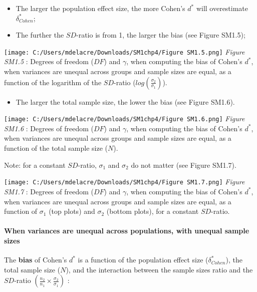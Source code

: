 \documentclass[
  english,
  man,mask,floatsintext]{apa6}
\providecommand{\tightlist}{%
  \setlength{\itemsep}{0pt}\setlength{\parskip}{0pt}}
\let\oldparagraph\paragraph
\renewcommand{\paragraph}[1]{\oldparagraph{#1}\mbox{}}
\begin{document}
\begin{itemize}
\item
  The larger the population effect size, the more Cohen's \(d^*\) will overestimate \(\delta^*_{Cohen}\);
\item
  The further the \(SD\)-ratio is from 1, the larger the bias (see Figure SM1.5);
\end{itemize}

\texttt{[image: C:/Users/mdelacre/Downloads/SM1chp4/Figure SM1.5.png]}
\emph{Figure SM1.5} : Degrees of freedom (\(DF\)) and \(\gamma\), when computing the bias of Cohen's \(d^*\), when variances are unequal across groups and sample sizes are equal, as a function of the logarithm of the \(SD\)-ratio (\(log \left( \frac{\sigma_2}{\sigma_1} \right)\)).

\begin{itemize}
\tightlist
\item
  The larger the total sample size, the lower the bias (see Figure SM1.6).
\end{itemize}

\texttt{[image: C:/Users/mdelacre/Downloads/SM1chp4/Figure SM1.6.png]}
\emph{Figure SM1.6} : Degrees of freedom (\(DF\)) and \(\gamma\), when computing the bias of Cohen's \(d^*\), when variances are unequal across groups and sample sizes are equal, as a function of the total sample size (\(N\)).

Note: for a constant \(SD\)-ratio, \(\sigma_1\) and \(\sigma_2\) do not matter (see Figure SM1.7).

\texttt{[image: C:/Users/mdelacre/Downloads/SM1chp4/Figure SM1.7.png]}
\emph{Figure SM1.7} : Degrees of freedom (\(DF\)) and \(\gamma\), when computing the bias of Cohen's \(d^*\), when variances are unequal across groups and sample sizes are equal, as a function of \(\sigma_1\) (top plots) and \(\sigma_2\) (bottom plots), for a constant \(SD\)-ratio.

\hypertarget{when-variances-are-unequal-across-populations-with-unequal-sample-sizes}{%
\paragraph{When variances are unequal across populations, with unequal sample sizes}\label{when-variances-are-unequal-across-populations-with-unequal-sample-sizes}}

The \textbf{bias} of Cohen's \(d^*\) is a function of the population effect size (\(\delta^*_{Cohen}\)), the total sample size (\(N\)), and the interaction between the sample sizes ratio and the \(SD\)-ratio \(\left(\frac{n_2}{n_1}\times\frac{\sigma_2}{\sigma_1} \right)\) :
\end{document}
